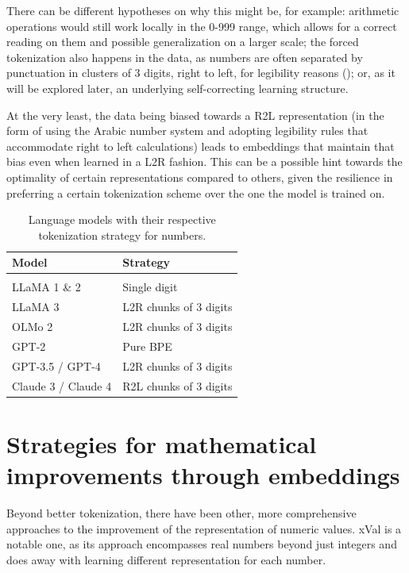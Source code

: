\documentclass[
  a4paper, twoside, 10pt, titlepage]{book}
\begin{document}
There can be different hypotheses on why this might be, for example:
arithmetic operations would still work locally in the 0-999 range, which
allows for a correct reading on them and possible generalization on a
larger scale; the forced tokenization also happens in the data, as
numbers are often separated by punctuation in clusters of 3 digits,
right to left, for legibility reasons (); or, as it will be explored later, an underlying
self-correcting learning structure.

At the very least, the data being biased towards a R2L representation
(in the form of using the Arabic number system and adopting legibility
rules that accommodate right to left calculations) leads to embeddings
that maintain that bias even when learned in a L2R fashion. This can be
a possible hint towards the optimality of certain representations
compared to others, given the resilience in preferring a certain
tokenization scheme over the one the model is trained on.

\begin{longtable}[]{@{}ll@{}}
\toprule\noalign{}
\textbf{Model} & \textbf{Strategy} \\
\midrule\noalign{}
\endhead
\bottomrule\noalign{}
\tabularnewline
\caption{Language models with their respective tokenization strategy for
numbers.}
\endlastfoot
LLaMA 1 \& 2 & Single digit \\
LLaMA 3 & L2R chunks of 3 digits \\
OLMo 2 & L2R chunks of 3 digits \\
GPT-2 & Pure BPE \\
GPT-3.5 / GPT-4 & L2R chunks of 3 digits \\
Claude 3 / Claude 4 & R2L chunks of 3 digits \\
\end{longtable}

\section{Strategies for mathematical improvements through
embeddings}\label{strategies-for-mathematical-improvements-through-embeddings}

Beyond better tokenization, there have been other, more comprehensive
approaches to the improvement of the representation of numeric values.
xVal is a notable one, as its approach encompasses real numbers beyond
just integers and does away with learning different representation for
each number.
\end{document}
